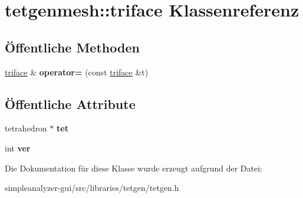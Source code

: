 \hypertarget{classtetgenmesh_1_1triface}{\section{tetgenmesh\-:\-:triface Klassenreferenz}
\label{classtetgenmesh_1_1triface}
}
\subsection*{Öffentliche Methoden}
\begin{DoxyCompactItemize}
\item 
\hypertarget{classtetgenmesh_1_1triface_aeb0b1b77a12ca18599472e01ae8fe119}{\hyperlink{classtetgenmesh_1_1triface}{triface} \& {\bfseries operator=} (const \hyperlink{classtetgenmesh_1_1triface}{triface} \&t)}\label{classtetgenmesh_1_1triface_aeb0b1b77a12ca18599472e01ae8fe119}

\end{DoxyCompactItemize}
\subsection*{Öffentliche Attribute}
\begin{DoxyCompactItemize}
\item 
\hypertarget{classtetgenmesh_1_1triface_ad3b174c4040b18a5286ddfeb8db02529}{tetrahedron $\ast$ {\bfseries tet}}\label{classtetgenmesh_1_1triface_ad3b174c4040b18a5286ddfeb8db02529}

\item 
\hypertarget{classtetgenmesh_1_1triface_a2b2b1dc34da73125359d6db535d75f7c}{int {\bfseries ver}}\label{classtetgenmesh_1_1triface_a2b2b1dc34da73125359d6db535d75f7c}

\end{DoxyCompactItemize}


Die Dokumentation für diese Klasse wurde erzeugt aufgrund der Datei\-:\begin{DoxyCompactItemize}
\item 
simpleanalyzer-\/gui/src/libraries/tetgen/tetgen.\-h\end{DoxyCompactItemize}
